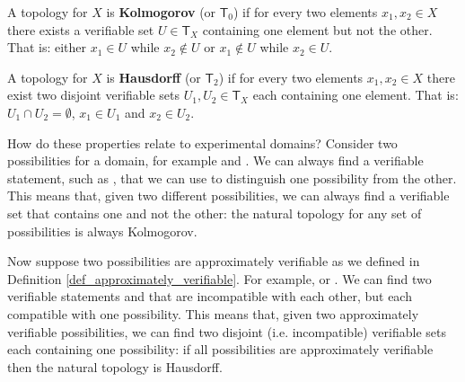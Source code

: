 \documentclass[11pt,letterpaper,fleqn]{memoir} %
\begin{document}
\begin{mathSection}
	\begin{defn}
		A topology for $X$ is \textbf{Kolmogorov} (or $\mathsf{T}_0$) if for every two elements $x_1, x_2 \in X$ there exists a verifiable set $U \in \mathsf{T}_X$ containing one element but not the other. That is: either $x_1 \in U$ while $x_2 \notin U$ or $x_1 \notin U$ while $x_2 \in U$.
	\end{defn}
	\begin{defn}
	A topology for $X$ is \textbf{Hausdorff} (or $\mathsf{T}_2$) if for every two elements $x_1, x_2 \in X$ there exist two disjoint verifiable sets $U_1, U_2 \in \mathsf{T}_X$ each containing one element. That is: $U_1 \cap U_2 = \emptyset$, $x_1 
	\in U_1$ and $x_2 \in U_2$.
\end{defn}

\end{mathSection}

How do these properties relate to experimental domains? Consider two possibilities for a domain, for example  and . We can always find a verifiable statement, such as , that we can use to distinguish one possibility from the other. This means that, given two different possibilities, we can always find a verifiable set that contains one and not the other: the natural topology for any set of possibilities is always Kolmogorov.

Now suppose two possibilities are approximately verifiable as we defined in Definition \ref{def_approximately_verifiable}. For example,  or . We can find two verifiable statements  and  that are incompatible with each other, but each compatible with one possibility. This means that, given two approximately verifiable possibilities, we can find two disjoint (i.e. incompatible) verifiable sets each containing one possibility: if all possibilities are approximately verifiable then the natural topology is Hausdorff.
\end{document}
